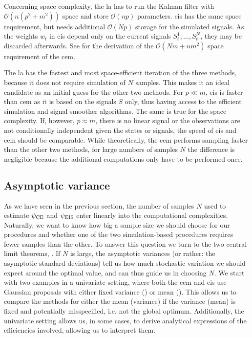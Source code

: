 Concerning space complexity, the \gls{la} has to run the Kalman filter with $\mathcal O(n (p^{2} + m^{2}))$ space and store $\mathcal O(n p)$ parameters. 
\gls{eis} has the same space requirement, but needs additional $\mathcal O(Np)$ storage for the simulated signals. As the weights $w_{t}$ in \gls{eis} depend only on the current signals $S^{1}_{t}, \dots, S^{N}_{t}$, they may be discarded afterwards. See  for the derivation of the $\mathcal O(Nm + nm^{2})$ space requirement of the \gls{cem}.

The \gls{la} has the fastest and most space-efficient iteration of the three methods, because it does not require simulation of $N$ samples. This makes it an ideal candidate as an initial guess for the other two methods. 
 For $p \ll m$, \gls{eis} is faster than \gls{cem} as it is based on the signals $S$ only, thus having access to the efficient simulation and signal smoother algorithms. The same is true for the space complexity. If, however, $p\approx m$, there is no linear signal or the observations are not conditionally independent given the states or signals, the speed of \gls{eis} and \gls{cem} should be comparable. 
While theoretically, the \gls{cem} performs sampling faster than the other two methods, for large numbers of samples $N$ the difference is negligible because the additional computations only have to be performed once. 

\subsection{Asymptotic variance}
As we have seen in the previous section, the number of samples $N$ used to estimate ${\psi_{\text{CE}}}$ and ${\psi_{\text{EIS}}}$ enter linearly into the computational complexities. Naturally, we want to know how big a sample size we should choose for our procedures and whether one of the two simulation-based procedures requires fewer samples than the other. To answer this question we turn to the two central limit theorems, . If $N$ is large, the asymptotic variances (or rather: the asymptotic standard deviations) tell us how much stochastic variation we should expect around the optimal value, and can thus guide us in choosing $N$. 
We start with two examples in a univariate setting, where both the \gls{cem} and \gls{eis} use Gaussian proposals with either fixed variance () or mean ().
This allows us to compare the methods for either the mean (variance) if the variance (mean) is fixed and potentially misspecified, i.e. not the global optimum. Additionally, the univariate setting allows us, in some cases, to derive analytical expressions of the efficiencies involved, allowing us to interpret them. 

